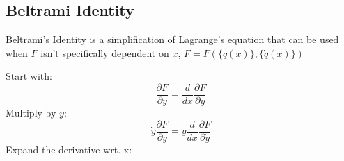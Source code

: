 \documentclass[table,cmyk]{article}
\begin{document}
\begin{longtable}
\section*{Beltrami Identity}
    Beltrami's Identity is a simplification of Lagrange's equation that can be
    used when $F$ isn't specifically dependent on $x$, $F=F(\{q(x)\}, \{\dot q(x)\})$

    Start with:
    \begin{displaymath}
     \frac{\partial F}{\partial y} = \frac{d}{dx}\frac{\partial F}{\partial \dot
     y} 
    \end{displaymath}
    Multiply by $\dot y$:
    \begin{displaymath}
     \dot y \frac{\partial F}{\partial y}=\dot y \frac{d}{dx}\frac{\partial
       F}{\partial \dot y} 
    \end{displaymath}
    Expand the derivative wrt. x:
    \begin{displaymath}
      
    \end{displaymath}
\tabularnewline\hline

\end{longtable}
\end{document}
